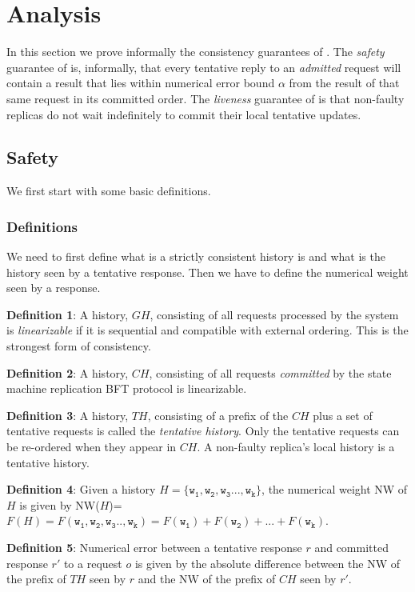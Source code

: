 \documentclass[twocolumn,10pt]{article}
\begin{document}
{\section{Analysis}
\label{sec:analysis}

In this section we prove informally the consistency guarantees of \Sys. The
\emph{safety} guarantee of \Sys is, informally, that every tentative
reply to an \emph{admitted} request will contain a result that lies
within numerical error bound $\alpha$ from the result of that same
request in its committed order.  The \emph{liveness} guarantee of \Sys
is  that non-faulty
replicas do not wait indefinitely to commit their local tentative updates.

\subsection{Safety}
We first start with some basic definitions.

\subsubsection{Definitions}

We need to first define what is a strictly consistent history is and what
is the history seen by a tentative response. Then we have to define the
numerical weight seen by a response.

\textbf{Definition 1}: A history, $GH$, consisting of all
requests processed by the system is \emph{linearizable} if it is sequential and 
compatible with external ordering. This is the strongest form of consistency.

\textbf{Definition 2}: A history, $CH$, consisting of all requests \emph{committed}
by the state machine replication BFT protocol is linearizable. 

\textbf{Definition 3}: A history, $TH$, consisting of a prefix of the $CH$ plus a set
of tentative requests is called the \emph{tentative history}. Only the tentative requests can
be re-ordered when they appear in $CH$. A non-faulty replica's local history is a tentative
history.

\textbf{Definition 4}: Given a history $H=\{\mathtt{w_1,w_2,w_3...,w_k}\}$, the numerical
weight NW of $H$ is given by NW($H$)= $F(H) = F(\mathtt{w_1,w_2,w_3..,w_k}) = F(\mathtt{w_1})+
F(\mathtt{w_2})+...+F(\mathtt{w_k})$.

\textbf{Definition 5}:
Numerical error between a tentative response $r$ and
committed response $r'$ to a request $o$ is given by the absolute difference between
the NW of the prefix of $TH$ seen by $r$ and the NW of the prefix of $CH$ seen by $r'$.


}
\end{document}
